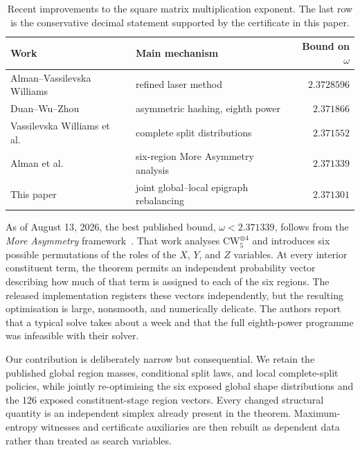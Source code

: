 \documentclass[11pt,reqno]{amsart}
\theoremstyle{definition}
\theoremstyle{remark}
\newcommand{\CW}{\mathrm{CW}}
\begin{document}
\begin{table}[t]
  \centering
  \caption{Recent improvements to the square matrix multiplication exponent.  The last row is the
  conservative decimal statement supported by the certificate in this paper.}
  \label{tab:records}
  \small
  \begin{tabularx}{\textwidth}{@{}>{\raggedright\arraybackslash}p{}Xr@{}}
    \toprule
    Work & Main mechanism & Bound on $\omega$ \\
    \midrule
    Alman--Vassilevska Williams~\cite{AlmanWilliams2024}
      & refined laser method & $2.3728596$ \\
    Duan--Wu--Zhou~\cite{DuanWuZhou2023}
      & asymmetric hashing, eighth power & $2.371866$ \\
    Vassilevska Williams et al.~\cite{VXXZ2024}
      & complete split distributions & $2.371552$ \\
    Alman et al.~\cite{MoreAsymmetry}
      & six-region More Asymmetry analysis & $2.371339$ \\
    This paper
      & joint global--local epigraph rebalancing & $2.371301$ \\
    \bottomrule
  \end{tabularx}
\end{table}

As of August 13, 2026, the best published bound, $\omega<2.371339$, follows from the \emph{More Asymmetry}
framework~\cite{MoreAsymmetry}.  That work analyses $\CW_5^{\otimes4}$ and introduces six possible
permutations of the roles of the $X$, $Y$, and $Z$ variables.  At every interior constituent term, the
theorem permits an independent probability vector describing how much of that term is assigned to each
of the six regions.  The released implementation registers these vectors independently, but the resulting
optimisation is large, nonsmooth, and numerically delicate.  The authors report that a typical solve takes
about a week and that the full eighth-power programme was infeasible with their solver.

Our contribution is deliberately narrow but consequential.  We retain the published global region masses,
conditional split laws, and local complete-split policies, while jointly re-optimising the six exposed
global shape distributions and the 126 exposed constituent-stage region vectors.  Every changed
structural quantity is an independent simplex already present in the theorem.  Maximum-entropy witnesses
and certificate auxiliaries are then rebuilt as dependent data rather than treated as search variables.
\end{document}
